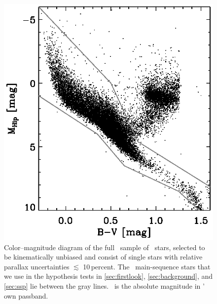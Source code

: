 \clearpage
\begin{figure}
\includegraphics[]{figs_groups/cmd.ps}
\caption[Color--magnitude diagram of the full \Hipparcos\ sample of
  \nstars\ stars]{Color--magnitude diagram of the full \Hipparcos\
  sample of \nstars\ stars, selected to be kinematically unbiased and
  consist of single stars with relative parallax uncertainties
  $\lesssim$ 10\,percent. The \nstarsms\ main-sequence stars that we
  use in the hypothesis tests in \sectionname \sectionname
  \ref{sec:firstlook}, \ref{sec:background}, and \ref{sec:ssp} lie
  between the gray lines.  \mhip\ is the absolute magnitude in
  \Hipparcos' own passband.}\label{fig:cmd}
\end{figure}


